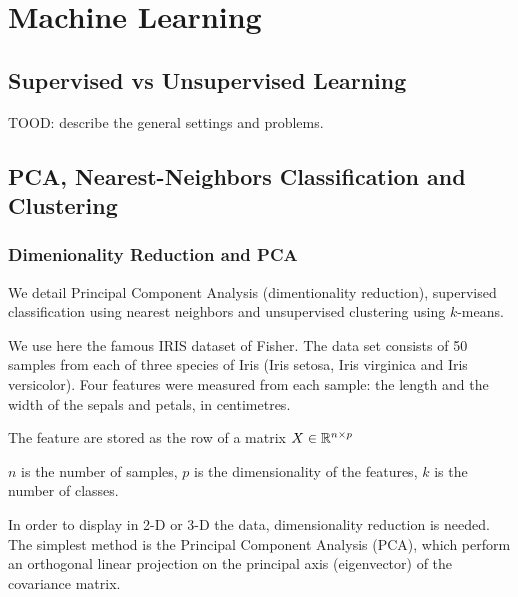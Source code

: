 
\chapter{Machine Learning}



\section{Supervised vs Unsupervised Learning}

TOOD: describe the general settings and problems. 

\section{PCA, Nearest-Neighbors Classification and Clustering}


\subsection{Dimenionality Reduction and PCA}

We detail Principal Component Analysis (dimentionality reduction), supervised classification using nearest neighbors
and unsupervised clustering using $k$-means.


We use here the famous
IRIS dataset of Fisher. 
The data set consists of 50 samples from each of three species of Iris (Iris setosa, Iris virginica and Iris versicolor).
 Four features were measured from each sample: the length and the width of the sepals and petals, in centimetres. 


The feature are stored as the row of a matrix $X \in \mathbb{R}^{n \times p}$

$n$ is the number of samples, $p$ is the dimensionality of the features,
$k$ is the number of classes.


In order to display in 2-D or 3-D the data, dimensionality reduction is needed.
The simplest method is the Principal Component Analysis (PCA), 
which perform an orthogonal linear projection on the principal axis (eigenvector) of the
covariance matrix.


